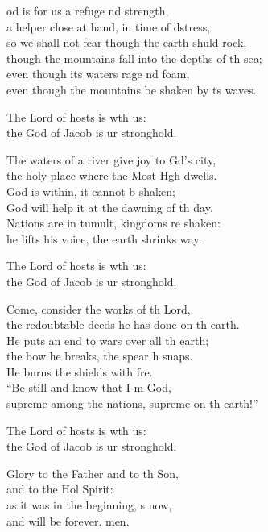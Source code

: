 \settowidth{\versewidth}{though the mountains fall into the depths of the sea;}
\begin{psalmverse}%
  \begin{patverse}
od is for us a refuge nd strength,\Med\\
a helper close at hand, in time of dstress,\\
so we shall not fear though the earth shuld rock,\Med\\
though the mountains fall into the depths of th sea;\\
even though its waters rage nd foam,\Med\\
even though the mountains be shaken by ts waves.

The Lord of hosts is wth us:\Med\\
the God of Jacob is ur stronghold.

The waters of a river give joy to Gd’s city,\Med\\
the holy place where the Most Hgh dwells.\\
God is within, it cannot b shaken;\Med\\
God will help it at the dawning of th day.\\
Nations are in tumult, kingdoms re shaken:\Med\\
he lifts his voice, the earth shrinks way.

The Lord of hosts is wth us:\Med\\
the God of Jacob is ur stronghold.

Come, consider the works of th Lord,\Med\\
the redoubtable deeds he has done on th earth.\\
He puts an end to wars over all th earth;\Med\\
the bow he breaks, the spear h snaps.\\
He burns the shields with fre.\Flex\\
“Be still and know that I m God,\Med\\
supreme among the nations, supreme on th earth!”

The Lord of hosts is wth us:\Med\\
the God of Jacob is ur stronghold.

Glory to the Father and to th Son,\Med\\
and to the Hol Spirit:\\
as it was in the beginning, s now,\Med\\
and will be forever. men. 
  \end{patverse}
\end{psalmverse}
